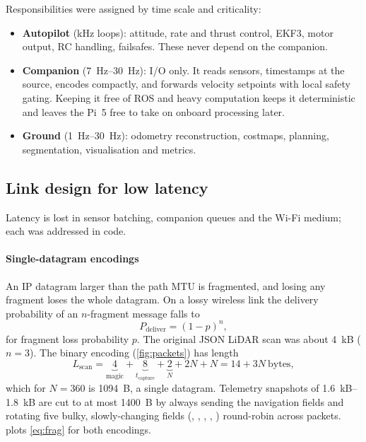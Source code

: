 Responsibilities were assigned by time scale and criticality:
\begin{itemize}[leftmargin=*,itemsep=1pt]
  \item \textbf{Autopilot} (\si{\kilo\hertz} loops): attitude, rate and thrust control,
    EKF3, motor output, RC handling, failsafes. These never depend on the companion.
  \item \textbf{Companion} (\SIrange{7}{30}{\hertz}): I/O only. It reads sensors,
    timestamps at the source, encodes compactly, and forwards velocity setpoints with
    local safety gating. Keeping it free of ROS and heavy computation keeps it
    deterministic and leaves the Pi~5 free to take on onboard processing later.
  \item \textbf{Ground} (\SIrange{1}{30}{\hertz}): odometry reconstruction, costmaps,
    planning, segmentation, visualisation and metrics.
\end{itemize}

\subsection{Link design for low latency}
\label{sec:design-link}

Latency is lost in sensor batching, companion queues and the Wi-Fi medium; each
was addressed in code.

\paragraph{Single-datagram encodings} An IP datagram larger than the path MTU is
fragmented, and losing any fragment loses the whole datagram. On a lossy wireless link
the delivery probability of an $n$-fragment message falls to
\begin{equation}
  P_{\text{deliver}} = (1-p)^{n},
  \label{eq:frag}
\end{equation}
for fragment loss probability $p$. The original JSON LiDAR scan was about \SI{4}{kB}
($n{=}3$). The binary encoding (\cref{fig:packets}) has length
\begin{equation}
  L_{\text{scan}} = \underbrace{4}_{\text{magic}} + \underbrace{8}_{t_\text{capture}} +
  \underbrace{2}_{N} + 2N + N = 14 + 3N\ \text{bytes},
\end{equation}
which for $N{=}360$ is \SI{1094}{B}, a single datagram. Telemetry snapshots of
\SIrange{1.6}{1.8}{kB} are cut to at most \SI{1400}{B} by always sending the
navigation fields and rotating five bulky, slowly-changing fields
(, , , ,
) round-robin across packets.
 plots \cref{eq:frag} for both encodings.

